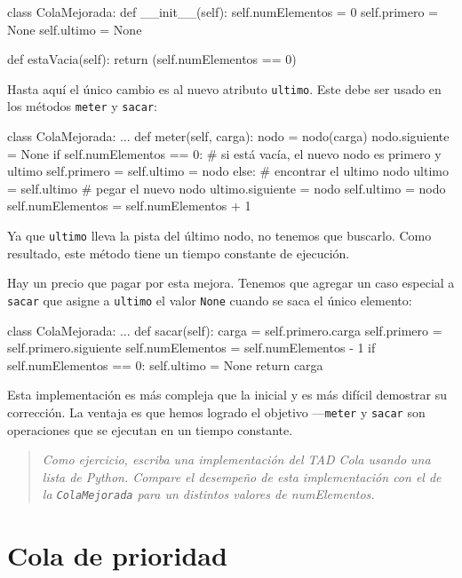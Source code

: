 \beforeverb 
\begin{pythoncode}
class ColaMejorada:
  def __init__(self):
    self.numElementos = 0
    self.primero   = None
    self.ultimo   = None

  def estaVacia(self):
    return (self.numElementos == 0)
\end{pythoncode}
\afterverb Hasta aquí el único cambio es al nuevo atributo \texttt{ultimo}.
Este debe ser usado en los métodos \texttt{meter} y \texttt{sacar}:

\beforeverb 
\begin{pythoncode}
class ColaMejorada:
  ...
  def meter(self, carga):
    nodo = nodo(carga)
    nodo.siguiente = None
    if self.numElementos == 0:
      # si está vacía, el nuevo nodo es primero y ultimo
      self.primero = self.ultimo = nodo
    else:
      # encontrar el ultimo nodo
      ultimo = self.ultimo
      # pegar el nuevo nodo
      ultimo.siguiente = nodo
      self.ultimo = nodo
    self.numElementos = self.numElementos + 1
\end{pythoncode}
\afterverb Ya que \texttt{ultimo} lleva la pista del último nodo,
no tenemos que buscarlo. Como resultado, este método tiene un tiempo
constante de ejecución.

Hay un precio que pagar por esta mejora. Tenemos que agregar un caso
especial a \texttt{sacar} que asigne a \texttt{ultimo} el valor \texttt{None}
cuando se saca el único elemento:

\beforeverb 
\begin{pythoncode}
class ColaMejorada:
  ...
  def sacar(self):
    carga     = self.primero.carga
    self.primero = self.primero.siguiente
    self.numElementos = self.numElementos - 1
    if self.numElementos == 0:
      self.ultimo = None
    return carga
\end{pythoncode}
\afterverb Esta implementación es más compleja que la inicial y es
más difícil demostrar su corrección. La ventaja es que hemos logrado
el objetivo —\texttt{meter} y \texttt{sacar} son operaciones que se
ejecutan en un tiempo constante.
\begin{quote}
{\em Como ejercicio, escriba una implementación del TAD Cola usando
una lista de Python. Compare el desempeño de esta implementación con
el de la \texttt{ColaMejorada} para un distintos valores de numElementos.} 
\end{quote}

\section{Cola de prioridad}

